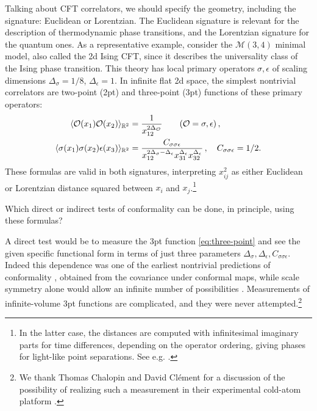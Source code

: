 \documentclass[a4paper,12pt]{article}
\theoremstyle{remark}
\theoremstyle{theorem}
\begin{document}
Talking about CFT correlators, we should specify the geometry, including the
signature: Euclidean or Lorentzian. The Euclidean signature is relevant for the
description of thermodynamic phase transitions, and the Lorentzian signature for
the quantum ones. As a representative example, consider the $\mathcal{M} (3,
4)$ minimal model, also called the 2d Ising CFT, since it describes the
universality class of the Ising phase transition. This theory has local
primary operators $\sigma, \epsilon$ of scaling dimensions $\Delta_{\sigma} =
1 / 8$, $\Delta_{\epsilon} = 1$. In infinite flat 2d space, the simplest
nontrivial correlators are two-point (2pt) and three-point (3pt) functions of
these primary operators:
\begin{align}
	\langle \mathcal{O}(x_1)\mathcal{O}(x_2) \rangle_{\mathbb{R}^2} & =
	\frac{1}{x_{12}^{2 \Delta_{\mathcal{O}}}}  \qquad (\mathcal{O}= \sigma,
	\epsilon) \hspace{0.17em},  \label{eq:two-point}\\
	\langle \sigma (x_1) \sigma (x_2) \epsilon (x_3) \rangle_{\mathbb{R}^2} & =
	\frac{C_{\sigma \sigma \epsilon}}{x_{12}^{2 \Delta_{\sigma} -
			\Delta_{\epsilon}} x_{31}^{\Delta_{\epsilon}} x_{32}^{\Delta_{\epsilon}}}
	\hspace{0.17em}, \quad C_{\sigma \sigma \epsilon} = 1 / 2. 
	\label{eq:three-point}
\end{align}
These formulas are valid in both signatures, interpreting $x^2_{ij}$ as either
Euclidean or Lorentzian distance squared between $x_i$ and $x_j$.\footnote{In
	the latter case, the distances are computed with infinitesimal imaginary parts
	for time differences, depending on the operator ordering, giving phases for
	light-like point separations. See e.g. {\cite{Hofman:2008ar}}.}

Which direct or indirect tests of conformality can be done, in principle, using
these formulas?

A direct test would be to measure the 3pt function \eqref{eq:three-point} and
see the given specific functional form in terms of just three parameters
$\Delta_{\sigma}, \Delta_{\epsilon}, C_{\sigma \sigma \epsilon}$. Indeed this
dependence was one of the earliest nontrivial predictions of conformality {\cite{Polyakov:1970xd}}, obtained from the covariance under conformal
maps, while scale symmetry alone would allow an infinite number of
possibilities {\cite{Rychkov:2016iqz}}. Measurements of infinite-volume 3pt
functions are complicated, and they were never attempted.\footnote{We thank
	Thomas Chalopin and David Cl{\'e}ment for a discussion of the possibility of
	realizing such a measurement in their experimental cold-atom platform
	{\cite{Allemand:2025pdq}}.} 
\end{document}
